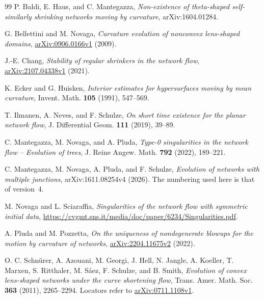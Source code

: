 \documentclass[11pt,reqno]{amsart}
\begin{document}
\begin{thebibliography}{99}
P. Baldi, E. Haus, and C. Mantegazza,
\emph{Non-existence of theta-shaped self-similarly shrinking networks moving by curvature},
arXiv:1604.01284.

G. Bellettini and M. Novaga, \emph{Curvature evolution of nonconvex
lens-shaped domains}, \href{https://arxiv.org/abs/0906.0166v1}{arXiv:0906.0166v1}
(2009).

J.-E. Chang, \emph{Stability of regular shrinkers in the network flow},
\href{https://arxiv.org/abs/2107.04338v1}{arXiv:2107.04338v1} (2021).

K. Ecker and G. Huisken,
\emph{Interior estimates for hypersurfaces moving by mean curvature},
Invent. Math. \textbf{105} (1991), 547--569.

T. Ilmanen, A. Neves, and F. Schulze,
\emph{On short time existence for the planar network flow},
J. Differential Geom. \textbf{111} (2019), 39--89.

C. Mantegazza, M. Novaga, and A. Pluda,
\emph{Type-0 singularities in the network flow -- Evolution of trees},
J. Reine Angew. Math. \textbf{792} (2022), 189--221.

C. Mantegazza, M. Novaga, A. Pluda, and F. Schulze,
\emph{Evolution of networks with multiple junctions},
arXiv:1611.08254v4 (2026).
The numbering used here is that of version~4.

M. Novaga and L. Sciaraffia,
\emph{Singularities of the network flow with symmetric initial data},
\url{https://cvgmt.sns.it/media/doc/paper/6234/Singularities.pdf}.

A. Pluda and M. Pozzetta, \emph{On the uniqueness of nondegenerate blowups
for the motion by curvature of networks},
\href{https://arxiv.org/abs/2204.11675v2}{arXiv:2204.11675v2} (2022).

O. C. Schn\"urer, A. Azouani, M. Georgi, J. Hell, N. Jangle,
A. Koeller, T. Marxen, S. Ritthaler, M. S\'aez, F. Schulze, and B. Smith,
\emph{Evolution of convex lens-shaped networks under the curve shortening flow},
Trans. Amer. Math. Soc. \textbf{363} (2011), 2265--2294.
Locators refer to \href{https://arxiv.org/abs/0711.1108v1}{arXiv:0711.1108v1}.
\end{thebibliography}
\end{document}
